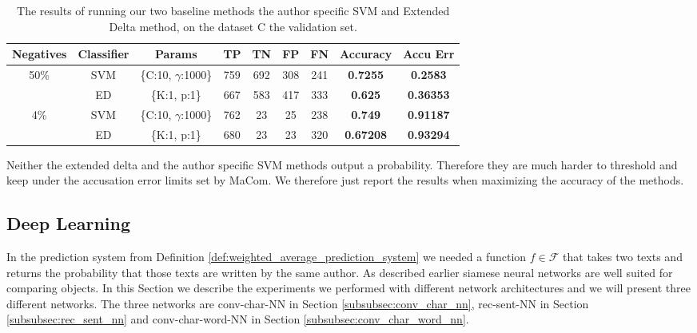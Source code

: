 \begin{table}[h]
    \begin{adjustbox}{center}
    \begin{tabular}{|c|c|c|c|c|c|c||c|c|}
        \hline
        Negatives & Classifier & Params & TP & TN & FP & FN & \textbf{Accuracy} & \textbf{Accu Err} \\ \hline
        50\% & SVM & \{C:10, $\gamma$:1000\} &  759 & 692 & 308 & 241 & \textbf{0.7255} & \textbf{0.2583} \\ \cline{2-9} 
        & ED & \{K:1, p:1\} & 667 & 583 & 417 & 333 & \textbf{0.625} & \textbf{0.36353} \\ \hline
        4\% & SVM & \{C:10, $\gamma$:1000\} & 762 & 23 & 25 & 238 & \textbf{0.749} & \textbf{0.91187} \\ \cline{2-9} 
        & ED & \{K:1, p:1\} & 680 & 23 & 23 & 320 & \textbf{0.67208} & \textbf{0.93294} \\ \hline
    \end{tabular}
    \end{adjustbox}
    \caption{The results of running our two baseline methods the author specific
        \gls{SVM} and Extended Delta method, on the dataset \gls{C} the
        validation set.}
    \label{tab:baseline-val-res}
\end{table}

Neither the extended delta and the author specific \gls{SVM} methods output a
probability. Therefore they are much harder to threshold and keep under the
accusation error limits set by MaCom. We therefore just report the results when
maximizing the accuracy of the methods.


\subsection{Deep Learning}

In the prediction system from Definition
\ref{def:weighted_average_prediction_system} we needed a function $f \in
\mathcal{F}$ that takes two texts and returns the probability that those
texts are written by the same author. As described earlier siamese neural
networks are well suited for comparing objects. In this Section we describe
the experiments we performed with different network architectures and we will
present three different networks. The three networks are \gls{conv-char-NN}
in Section \ref{subsubsec:conv_char_nn}, \gls{rec-sent-NN} in Section
\ref{subsubsec:rec_sent_nn} and \gls{conv-char-word-NN} in Section
\ref{subsubsec:conv_char_word_nn}.


